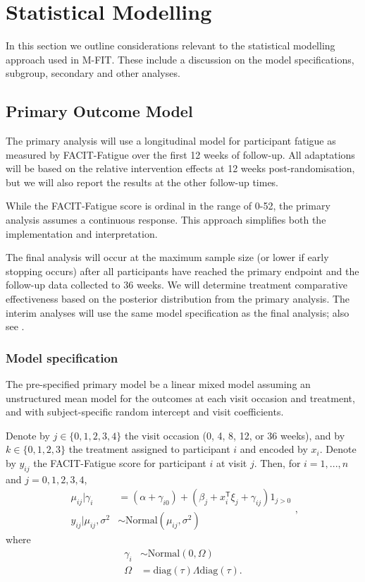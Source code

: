 \documentclass[11pt,parskip=half-]{scrartcl}
\begin{document}
\clearpage

\section{Statistical Modelling}\label{statistical-modelling}

In this section we outline considerations relevant to the statistical modelling approach used in M-FIT. These include a discussion on the model specifications, subgroup, secondary and other analyses.

\subsection{Primary Outcome Model}\label{primary-model}

The primary analysis will use a longitudinal model for participant fatigue as measured by FACIT-Fatigue over the first 12 weeks of follow-up. All adaptations will be based on the relative intervention effects at 12 weeks post-randomisation, but we will also report the results at the other follow-up times.

While the FACIT-Fatigue score is ordinal in the range of 0-52, the primary analysis assumes a continuous response. This approach simplifies both the implementation and interpretation.

The final analysis will occur at the maximum sample size (or lower if early stopping occurs) after all participants have reached the primary endpoint and the follow-up data collected to 36 weeks. We will determine treatment comparative effectiveness based on the posterior distribution from the primary analysis. The interim analyses will use the same model specification as the final analysis; also see .

\subsubsection{Model specification}\label{model-specification}

The pre-specified primary model  be a linear mixed model assuming an unstructured mean model for the outcomes at each visit occasion and treatment, and with subject-specific random intercept and visit coefficients.

Denote by $j\in\{0,1,2,3, 4\}$ the visit occasion (0, 4, 8, 12, or 36 weeks), and by $k\in\{0,1,2,3\}$ the treatment assigned to participant $i$ and encoded by $x_i$.
Denote by $y_{ij}$ the FACIT-Fatigue score for participant $i$ at visit $j$.
Then, for $i=1,...,n$ and $j=0,1,2,3,4$,
$$
  \begin{aligned}
    \mu_{ij}|\gamma_i        & = (\alpha+\gamma_{i0}) + (\beta_j + x_i^\mathsf{T}\xi_{j} + \gamma_{ij})1_{j>0} \\
    y_{ij}|\mu_{ij},\sigma^2 & \sim \text{Normal}\left(\mu_{ij}, \sigma^2\right)
  \end{aligned},
$$
where
$$
  \begin{aligned}
    \gamma_i & \sim \text{Normal}\left(0, \Omega\right)     \\
    \Omega   & = \text{diag}(\tau)\Lambda\text{diag}(\tau).
  \end{aligned}
$$
\end{document}
